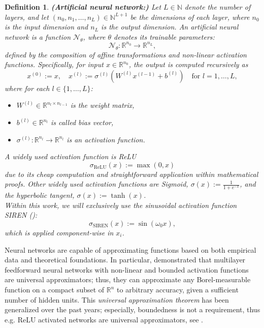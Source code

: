 \documentclass[12pt,openany]{book}
\newcommand{\R}{\mathbb{R}}
\theoremstyle{plainnormal}
\newtheorem{definition}[theorem]{Definition}
\theoremstyle{remark}
\begin{document}
\begin{definition}\textbf{(Artificial neural network:)}
   Let \( L \in \mathbb{N} \) denote the number of layers, and let \( (n_0, n_1, \dots, n_L) \in \mathbb{N}^{L+1} \) be the dimensions of each layer, where \( n_0 \) is the input dimension and \( n_L \) is the output dimension. An \textit{artificial neural network} is a function $\mathcal{N}_\theta$, where $\theta$ denotes its trainable parameters:
\[
\mathcal{N}_\theta: \mathbb{R}^{n_0} \rightarrow \mathbb{R}^{n_L},
\]
defined by the composition of affine transformations and non-linear activation functions. Specifically, for input \( x \in \mathbb{R}^{n_0} \), the output is computed recursively as
\[
x^{(0)} := x, \quad x^{(l)} := \sigma^{(l)}(W^{(l)} x^{(l-1)} + b^{(l)}) \quad \text{for } l = 1, \dots, L,
\]
where for each \( l \in \{1, \dots, L\} \):
\begin{itemize}
    \item \( W^{(l)} \in \mathbb{R}^{n_l \times n_{l-1}} \) is the weight matrix,
    \item \( b^{(l)} \in \mathbb{R}^{n_l} \) is called bias vector,
    \item \( \sigma^{(l)}: \mathbb{R}^{n_l} \rightarrow \mathbb{R}^{n_l} \) is an activation function.
\end{itemize}
A widely used activation function is ReLU $$\sigma_{\text{ReLU}}(x) := \max(0, x)$$
due to its cheap computation and straightforward application within mathematical proofs. Other widely used activation functions are Sigmoid, $\sigma(x) := \frac{1}{1+e^{-x}} $, and the hyperbolic tangent, $\sigma(x) :=\tanh(x)$.\\
Within this work, we will exclusively use the sinusoidal activation function SIREN (\cite{sitzmann2020implicitneuralrepresentationsperiodic}): $$\sigma_{\text{SIREN}}(x) := \sin(\omega_0 x),$$
which is applied component-wise in $x_i$.
\end{definition}
Neural networks are capable of approximating functions based on both empirical data and theoretical foundations. In particular, \cite{HORNIK1989359} demonstrated that multilayer feedforward neural networks with non-linear and bounded activation functions are universal approximators; thus, they can approximate any Borel-measurable function on a compact subset of $\R^n$ to arbitrary accuracy, given a sufficient number of hidden units. This \emph{universal approximation theorem} has been generalized over the past years; especially, boundedness is not a requirement, thus e.g. ReLU activated networks are universal approximators, see \cite{petersen2018optimalapproximationpiecewisesmooth}. \\
\end{document}
